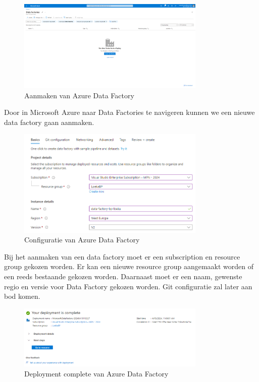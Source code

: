 \begin{figure}[H]
    \centering
    \includegraphics[width=0.8\textwidth]{./graphics/adf/initial.png}
    \caption{Aanmaken van Azure Data Factory}
\end{figure}

Door in Microsoft Azure naar Data Factories te navigeren kunnen we een nieuwe data factory gaan aanmaken.

\begin{figure}[H]
    \centering
    \includegraphics[width=0.8\textwidth]{./graphics/adf/initial_create.png}
    \caption{Configuratie van Azure Data Factory}
\end{figure}

Bij het aanmaken van een data factory moet er een subscription en resource group gekozen worden. Er kan een nieuwe resource group aangemaakt worden of een reeds bestaande gekozen worden. Daarnaast moet er een naam, gewenste regio en versie voor Data Factory gekozen worden. Git configuratie zal later aan bod komen.

\begin{figure}[H]
    \centering
    \includegraphics[width=0.8\textwidth]{./graphics/adf/deployment_complete_specific.png}
    \caption{Deployment complete van Azure Data Factory}
\end{figure}

